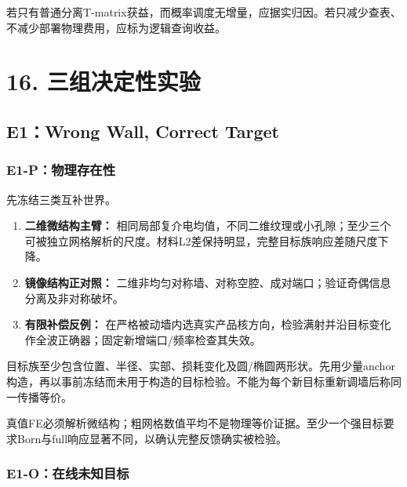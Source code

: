 \documentclass[
  10pt,
  a4paper,
]{article}
\providecommand{\tightlist}{%
  \setlength{\itemsep}{0pt}\setlength{\parskip}{0pt}}
\providecommand{\tightlist}{\setlength{\itemsep}{1pt}\setlength{\parskip}{1pt}}
\begin{document}
若只有普通分离T-matrix获益，而概率调度无增量，应据实归因。若只减少查表、不减少部署物理费用，应标为逻辑查询收益。

\hypertarget{ux4e09ux7ec4ux51b3ux5b9aux6027ux5b9eux9a8c}{%
\section{16.
三组决定性实验}\label{ux4e09ux7ec4ux51b3ux5b9aux6027ux5b9eux9a8c}}

\hypertarget{e1wrong-wall-correct-target}{%
\subsection{E1：Wrong Wall, Correct
Target}\label{e1wrong-wall-correct-target}}

\hypertarget{e1-pux7269ux7406ux5b58ux5728ux6027}{%
\subsubsection{E1-P：物理存在性}\label{e1-pux7269ux7406ux5b58ux5728ux6027}}

先冻结三类互补世界。

\begin{enumerate}
\def\labelenumi{\arabic{enumi}.}
\tightlist
\item
  \textbf{二维微结构主臂：}
  相同局部复介电均值，不同二维纹理或小孔隙；至少三个可被独立网格解析的尺度。材料L2差保持明显，完整目标族响应差随尺度下降。
\item
  \textbf{镜像结构正对照：}
  二维非均匀对称墙、对称空腔、成对端口；验证奇偶信息分离及非对称破坏。
\item
  \textbf{有限补偿反例：}
  在严格被动墙内选真实产品核方向，检验满射并沿目标变化作全波正确器；固定新增端口/频率检查其失效。
\end{enumerate}

目标族至少包含位置、半径、实部、损耗变化及圆/椭圆两形状。先用少量anchor构造，再以事前冻结而未用于构造的目标检验。不能为每个新目标重新调墙后称同一传播等价。

真值FE必须解析微结构；粗网格数值平均不是物理等价证据。至少一个强目标要求Born与full响应显著不同，以确认完整反馈确实被检验。

\hypertarget{e1-oux5728ux7ebfux672aux77e5ux76eeux6807}{%
\subsubsection{E1-O：在线未知目标}\label{e1-oux5728ux7ebfux672aux77e5ux76eeux6807}}
\end{document}
